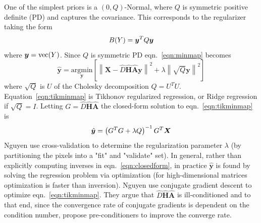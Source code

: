 One of the simplest priors is a $(0, Q)$-Normal, where $Q$ is symmetric positive definite (PD) and captures the covariance.
%
This corresponds to the regularizer taking the form
\begin{equation}
    B(Y) = \bm{y} ^T Q \bm{y}
\end{equation}
where $\bm{y} = \text{vec}(Y)$.
%
Since $Q$ is symmetric PD eqn.~\ref{eqn:minmap} becomes
\begin{equation}
    \hat{\bm{y}} = \underset{\bm{y}}{\text{argmin}}\left[ \left\| \bm{X} - \hat{D} \hat{\bm{H}} \hat{\bm{A}} \bm{y} \right\|^2 +\lambda \left\| \sqrt{Q}\bm{y} \right\|^2 \right]
    \label{eqn:tikminmap}
\end{equation}
where $\sqrt{Q}$ is $U$ of the Cholesky decomposition $Q = U^T U$.
%
Equation~\ref{eqn:tikminmap} is Tikhonov regularized regression, or Ridge regression if $\sqrt{Q} = I$.
%
Letting $G = \hat{D} \hat{\bm{H}} \hat{\bm{A}}$ the closed-form solution to eqn.~\ref{eqn:tikminmap} is
\begin{equation}
    \hat{\by} = \left( G^T G + \lambda Q \right)^{-1} G^T\bX
    \label{eqn:closedform}
\end{equation}
Nguyen \etal\cite{milanfar2001} use cross-validation to determine the regularization parameter $\lambda$ (by partitioning the pixels into a "fit" and "validate" set).
%
In general, rather than explicitly computing inverses in eqn.~\ref{eqn:closedform}, in practice $\hat{\bm{y}}$ is found by solving the regression problem via optimization (for high-dimensional matrices optimization is faster than inversion).
%
Nguyen \etal use conjugate gradient descent to optimize eqn.~\ref{eqn:tikminmap}.
%
They argue that $\hat{D} \hat{\bm{H}} \hat{\bm{A}}$ is ill-conditioned and to that end, since the convergence rate of conjugate gradients is dependent on the condition number\cite{vanderSluis1986}, propose pre-conditioners to improve the converge rate.

